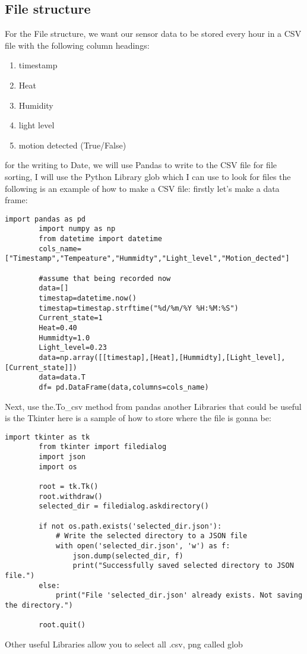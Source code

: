 	\subsection{File structure}
	For the  File structure, we want our sensor data to be stored every hour in a  CSV file with the following column headings:
	\begin{enumerate}
		\item timestamp
		\item Heat
		\item Humidity
		\item light level
		\item motion detected (True/False)
	\end{enumerate}
	for the writing to Date, we will use Pandas to write to the CSV file
	for file sorting, I will use the Python Library glob  which I can use  to look for  files 
	the following is an example of how  to  make a CSV file:
	firstly let's make a data frame:
	\begin{lstlisting}[style=mystyle,caption={sample code for turning sensor data into a data}]
		import pandas as pd
		import numpy as np
		from datetime import datetime
		cols_name=["Timestamp","Tempeature","Hummidty","Light_level","Motion_dected"]

		#assume that being recorded now
		data=[]
		timestap=datetime.now()
		timestap=timestap.strftime("%d/%m/%Y %H:%M:%S")
		Current_state=1
		Heat=0.40
		Hummidty=1.0
		Light_level=0.23
		data=np.array([[timestap],[Heat],[Hummidty],[Light_level],[Current_state]])
		data=data.T
		df= pd.DataFrame(data,columns=cols_name)
	\end{lstlisting}
	Next, use the.To\_csv method from  pandas
	another Libraries that could  be useful is the Tkinter
	here is a  sample of how to   store where the  file is  gonna be:
	\begin{lstlisting}[style=mystyle,caption={example code for storing directory}]
		import tkinter as tk
		from tkinter import filedialog
		import json
		import os

		root = tk.Tk()
		root.withdraw()
		selected_dir = filedialog.askdirectory()

		if not os.path.exists('selected_dir.json'):
			# Write the selected directory to a JSON file
			with open('selected_dir.json', 'w') as f:
				json.dump(selected_dir, f)
				print("Successfully saved selected directory to JSON file.")
		else:
			print("File 'selected_dir.json' already exists. Not saving the directory.")

		root.quit()
	\end{lstlisting}
	Other useful Libraries allow you to  select all  .csv, png  called glob
